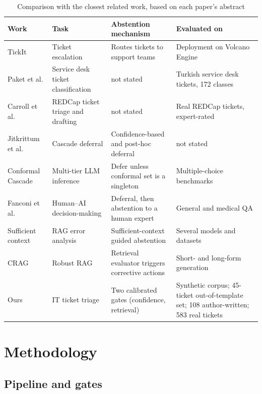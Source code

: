 \documentclass[conference,a4paper]{IEEEtran}
\begin{document}
\begin{table}[!t]
\caption{Comparison with the closest related work, based on each paper's abstract}\label{tab:rel}
\centering
\scriptsize
\setlength{\tabcolsep}{3pt}
\begin{tabular}{|P{0.210}|P{0.230}|P{0.280}|P{0.280}|}
\hline
\textbf{Work} & \textbf{Task} & \textbf{Abstention mechanism} & \textbf{Evaluated on}\\ \hline\hline
TickIt \cite{b1} & Ticket escalation & Routes tickets to support teams & Deployment on Volcano Engine\\ \hline
Paket et al. \cite{b2} & Service desk ticket classification & not stated & Turkish service desk tickets, 172 classes\\ \hline
Carroll et al. \cite{b3} & REDCap ticket triage and drafting & not stated & Real REDCap tickets, expert-rated\\ \hline
Jitkrittum et al. \cite{b4} & Cascade deferral & Confidence-based and post-hoc deferral & not stated\\ \hline
Conformal Cascade \cite{b5} & Multi-tier LLM inference & Defer unless conformal set is a singleton & Multiple-choice benchmarks\\ \hline
Fanconi et al. \cite{b6} & Human--AI decision-making & Deferral, then abstention to a human expert & General and medical QA\\ \hline
Sufficient context \cite{b13} & RAG error analysis & Sufficient-context guided abstention & Several models and datasets\\ \hline
CRAG \cite{b14} & Robust RAG & Retrieval evaluator triggers corrective actions & Short- and long-form generation\\ \hline
Ours & IT ticket triage & Two calibrated gates (confidence, retrieval) & Synthetic corpus; 45-ticket out-of-template set; 108 author-written; 583 real tickets\\ \hline
\end{tabular}
\end{table}

\section{Methodology}\label{sec:meth}

\subsection{Pipeline and gates}\label{sec:pipe}
\end{document}
